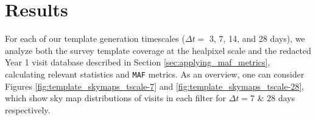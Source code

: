 \documentclass[preprintm,linenumbers]{aastex631}
\newcommand{\maf}{\texttt{MAF}\xspace}
\begin{document}
		
		\section{Results}
		\label{sec:results}
		
		
		For each of our template generation timescales ($\Delta t =$ 3, 7, 14, and 28 days), we analyze both the survey template coverage at the healpixel scale and the redacted Year 1 visit database described in Section \ref{sec:applying_maf_metrics}, calculating relevant statistics and \maf metrics. 
  As an overview, one can consider Figures \ref{fig:template_skymaps_tscale-7} and  \ref{fig:template_skymaps_tscale-28}, which show sky map distributions of visits in each filter for $\Delta t = 7$ \& $28$ days respectively.
\end{document}
